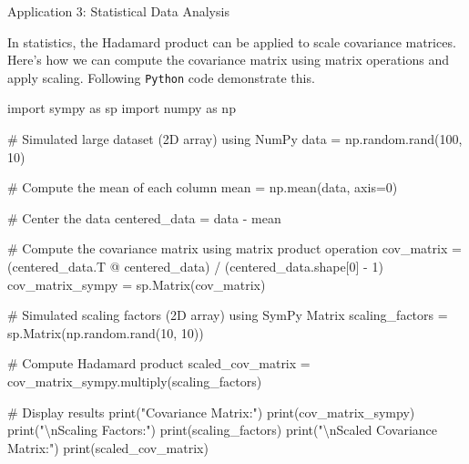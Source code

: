 \documentclass[
  letterpaper,
  DIV=11,
  numbers=noendperiod]{scrreprt}
\newenvironment{Shaded}{\begin{snugshade}}{\end{snugshade}}
\newcommand{\BuiltInTok}[1]{\textcolor[rgb]{0.00,0.23,0.31}{#1}}
\newcommand{\CharTok}[1]{\textcolor[rgb]{0.13,0.47,0.30}{#1}}
\newcommand{\CommentTok}[1]{\textcolor[rgb]{0.37,0.37,0.37}{#1}}
\newcommand{\DecValTok}[1]{\textcolor[rgb]{0.68,0.00,0.00}{#1}}
\newcommand{\ImportTok}[1]{\textcolor[rgb]{0.00,0.46,0.62}{#1}}
\newcommand{\NormalTok}[1]{\textcolor[rgb]{0.00,0.23,0.31}{#1}}
\newcommand{\OperatorTok}[1]{\textcolor[rgb]{0.37,0.37,0.37}{#1}}
\newcommand{\StringTok}[1]{\textcolor[rgb]{0.13,0.47,0.30}{#1}}
\theoremstyle{plain}
\theoremstyle{definition}
\theoremstyle{remark}
\begin{document}
Application 3: Statistical Data Analysis

In statistics, the Hadamard product can be applied to scale covariance
matrices. Here's how we can compute the covariance matrix using matrix
operations and apply scaling. Following \texttt{Python} code demonstrate
this.

\begin{Shaded}
\begin{Highlighting}[]
\ImportTok{import}\NormalTok{ sympy }\ImportTok{as}\NormalTok{ sp}
\ImportTok{import}\NormalTok{ numpy }\ImportTok{as}\NormalTok{ np}

\CommentTok{\# Simulated large dataset (2D array) using NumPy}
\NormalTok{data }\OperatorTok{=}\NormalTok{ np.random.rand(}\DecValTok{100}\NormalTok{, }\DecValTok{10}\NormalTok{)}

\CommentTok{\# Compute the mean of each column}
\NormalTok{mean }\OperatorTok{=}\NormalTok{ np.mean(data, axis}\OperatorTok{=}\DecValTok{0}\NormalTok{)}

\CommentTok{\# Center the data}
\NormalTok{centered\_data }\OperatorTok{=}\NormalTok{ data }\OperatorTok{{-}}\NormalTok{ mean}

\CommentTok{\# Compute the covariance matrix using matrix product operation}
\NormalTok{cov\_matrix }\OperatorTok{=}\NormalTok{ (centered\_data.T }\OperatorTok{@}\NormalTok{ centered\_data) }\OperatorTok{/}\NormalTok{ (centered\_data.shape[}\DecValTok{0}\NormalTok{] }\OperatorTok{{-}} \DecValTok{1}\NormalTok{)}
\NormalTok{cov\_matrix\_sympy }\OperatorTok{=}\NormalTok{ sp.Matrix(cov\_matrix)}

\CommentTok{\# Simulated scaling factors (2D array) using SymPy Matrix}
\NormalTok{scaling\_factors }\OperatorTok{=}\NormalTok{ sp.Matrix(np.random.rand(}\DecValTok{10}\NormalTok{, }\DecValTok{10}\NormalTok{))}

\CommentTok{\# Compute Hadamard product}
\NormalTok{scaled\_cov\_matrix }\OperatorTok{=}\NormalTok{ cov\_matrix\_sympy.multiply(scaling\_factors)}

\CommentTok{\# Display results}
\BuiltInTok{print}\NormalTok{(}\StringTok{"Covariance Matrix:"}\NormalTok{)}
\BuiltInTok{print}\NormalTok{(cov\_matrix\_sympy)}
\BuiltInTok{print}\NormalTok{(}\StringTok{"}\CharTok{\textbackslash{}n}\StringTok{Scaling Factors:"}\NormalTok{)}
\BuiltInTok{print}\NormalTok{(scaling\_factors)}
\BuiltInTok{print}\NormalTok{(}\StringTok{"}\CharTok{\textbackslash{}n}\StringTok{Scaled Covariance Matrix:"}\NormalTok{)}
\BuiltInTok{print}\NormalTok{(scaled\_cov\_matrix)}
\end{Highlighting}
\end{Shaded}
\end{document}
